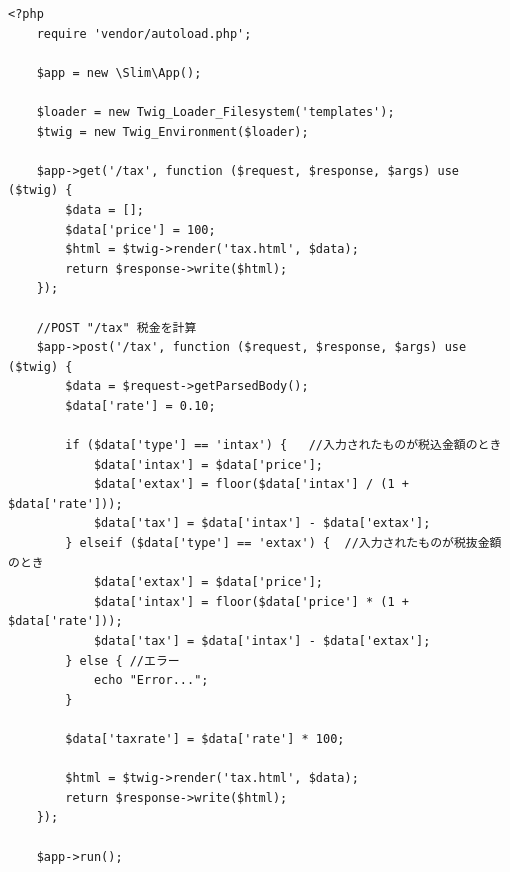 \documentclass[12pt]{jarticle}
\begin{document}
\begin{lstlisting}[style = lstphp,caption=課題1のindex.php]
    <?php
    require 'vendor/autoload.php';
    
    $app = new \Slim\App();
    
    $loader = new Twig_Loader_Filesystem('templates');
    $twig = new Twig_Environment($loader);
    
    $app->get('/tax', function ($request, $response, $args) use ($twig) {
        $data = [];
        $data['price'] = 100;
        $html = $twig->render('tax.html', $data);
        return $response->write($html);
    });
    
    //POST "/tax" 税金を計算
    $app->post('/tax', function ($request, $response, $args) use ($twig) {
        $data = $request->getParsedBody();
        $data['rate'] = 0.10;
    
        if ($data['type'] == 'intax') {   //入力されたものが税込金額のとき
            $data['intax'] = $data['price'];
            $data['extax'] = floor($data['intax'] / (1 + $data['rate'])); 
            $data['tax'] = $data['intax'] - $data['extax'];
        } elseif ($data['type'] == 'extax') {  //入力されたものが税抜金額のとき
            $data['extax'] = $data['price'];
            $data['intax'] = floor($data['price'] * (1 + $data['rate']));
            $data['tax'] = $data['intax'] - $data['extax'];
        } else { //エラー
            echo "Error...";
        }
    
        $data['taxrate'] = $data['rate'] * 100;
    
        $html = $twig->render('tax.html', $data);
        return $response->write($html);
    });
    
    $app->run();
    
    \end{lstlisting}
\end{document}
